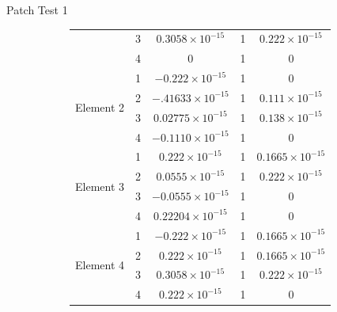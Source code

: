 \documentclass{beamer}
\begin{document}
\begin{frame}[t,fragile]{Patch Test 1}
\begin{figure}
\begin{subfigure}{0.45\textwidth}
{\begin{tabular}{|c|c|c|c|c|}
& 3 & $0.3058\times 10^{-15}$ & 1 & $0.222\times 10^{-15}$\\
& 4 & $0$ & 1 & $0$\\
\hline
\multirow{4}{5em}{Element 2} & 1 & $-0.222\times 10^{-15}$ & 1 & $0$\\
& 2 & $-.41633\times 10^{-15}$ & 1 & $0.111\times 10^{-15}$\\
& 3 & $0.02775\times 10^{-15}$ & 1 & $0.138\times 10^{-15}$\\
& 4 & $-0.1110\times 10^{-15}$ & 1 & $0$\\
\hline
\multirow{4}{5em}{Element 3} & 1 & $0.222\times 10^{-15}$ & 1 & $0.1665\times 10^{-15}$\\
& 2 & $0.0555\times 10^{-15}$ & 1 & $0.222\times 10^{-15}$\\
& 3 & $-0.0555\times 10^{-15}$ & 1 & $0$\\
& 4 & $0.22204\times 10^{-15}$ & 1 & $0$\\
\hline
\multirow{4}{5em}{Element 4} & 1 & $-0.222\times 10^{-15}$ & 1 & $0.1665\times 10^{-15}$\\
& 2 & $0.222\times 10^{-15}$ & 1 & $0.1665\times 10^{-15}$\\
& 3 & $0.3058\times 10^{-15}$ & 1 & $0.222\times 10^{-15}$\\
& 4 & $0.222\times 10^{-15}$ & 1 & $0$\\
\hline
\end{tabular}}
      \end{subfigure}
  \end{figure}
\end{frame}
\end{document}
